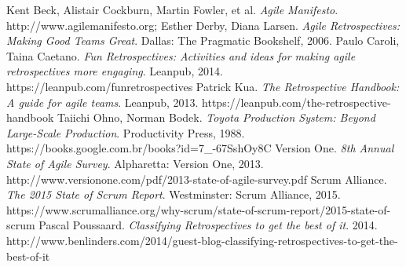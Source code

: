 \begin{thebibliography}{7} 

 Kent Beck, Alistair Cockburn, Martin Fowler, et al. \textit{Agile Manifesto}. http://www.agilemanifesto.org;
 Esther Derby, Diana Larsen. \textit{Agile Retrospectives: Making Good Teams Great}. Dallas: The Pragmatic Bookshelf, 2006.
 Paulo Caroli, Taina Caetano. \textit{Fun Retrospectives: Activities and ideas for making agile retrospectives more engaging}. Leanpub, 2014. https://leanpub.com/funretrospectives
 Patrick Kua. \textit{The Retrospective Handbook: A guide for agile teams}. Leanpub, 2013. https://leanpub.com/the-retrospective-handbook
 Taiichi Ohno, Norman Bodek. \textit{Toyota Production System: Beyond Large-Scale Production}. Productivity Press, 1988. https://books.google.com.br/books?id=7\_-67SshOy8C
 Version One. \textit{8th Annual State of Agile Survey}. Alpharetta: Version One, 2013. http://www.versionone.com/pdf/2013-state-of-agile-survey.pdf
 Scrum Alliance. \textit{The 2015 State of Scrum Report}. Westminster: Scrum Alliance, 2015. https://www.scrumalliance.org/why-scrum/state-of-scrum-report/2015-state-of-scrum
 Pascal Poussaard. \textit{Classifying Retrospectives to get the best of it}. 2014. http://www.benlinders.com/2014/guest-blog-classifying-retrospectives-to-get-the-best-of-it

\end{thebibliography}
